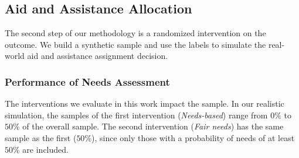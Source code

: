 \subsection{Aid and Assistance Allocation}
\label{sec:results_distribution}
The second step of our methodology is a randomized intervention on the outcome. We build a synthetic sample and use the labels to simulate the real-world aid and assistance assignment decision. 

\subsubsection{Performance of Needs Assessment}
\label{sec:results_models}
The interventions we evaluate in this work impact the sample. In our realistic simulation, the samples of the first intervention (\emph{Needs-based}) range from $0\%$ to $50\%$ of the overall sample. The second intervention (\emph{Fair needs}) has the same sample as the first ($50\%$), since only those with a probability of needs of at least $50\%$ are included.

